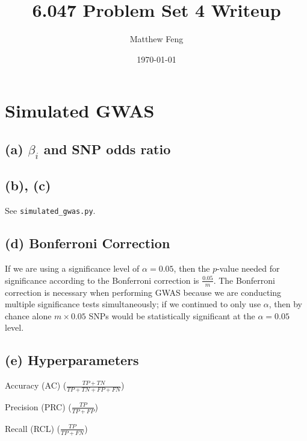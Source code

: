 \documentclass{article}[11pt]
\title{6.047 Problem Set 4 Writeup}
\author{Matthew Feng}
\date{\today}
\begin{document}
\maketitle

\section{Simulated GWAS}

\subsection*{(a) $\beta_i$ and SNP odds ratio}

\subsection*{(b), (c)}
See {\tt simulated\_gwas.py}.

\subsection*{(d) Bonferroni Correction}
If we are using a significance level of $\alpha = 0.05$, then
the $p$-value needed for significance according to the
Bonferroni correction is $\frac{0.05}{m}$. The Bonferroni
correction is necessary when performing GWAS
because we are conducting multiple significance tests
simultaneously; if we continued to only use $\alpha$, then
by chance alone $m \times 0.05$ SNPs would be
statistically significant at the $\alpha = 0.05$ level.

\subsection*{(e) Hyperparameters}
Accuracy (AC) ($\frac{TP + TN}{TP + TN + FP + FN}$)

\vspace{0.75em}
\noindent Precision (PRC) ($\frac{TP}{TP + FP}$)

\vspace{0.75em}
\noindent Recall (RCL) ($\frac{TP}{TP + FN}$)
\end{document}
